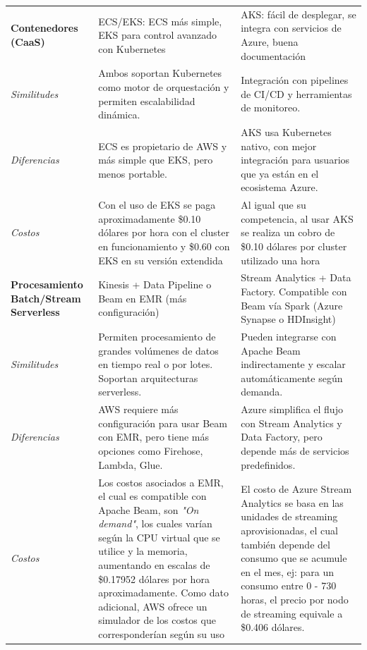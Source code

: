 \documentclass[12pt]{article}
\begin{document}
\begin{longtable}{|>{\RaggedRight\arraybackslash}p{4cm}|>{\RaggedRight\arraybackslash}p{5cm}|>{\RaggedRight\arraybackslash}p{5cm}|}
		\textbf{Contenedores (CaaS)} & ECS/EKS: ECS más simple, EKS para control avanzado con Kubernetes & AKS: fácil de desplegar, se integra con servicios de Azure, buena documentación \\
		\textit{Similitudes} & Ambos soportan Kubernetes como motor de orquestación y permiten escalabilidad dinámica. & Integración con pipelines de CI/CD y herramientas de monitoreo. \\
		\textit{Diferencias} & ECS es propietario de AWS y más simple que EKS, pero menos portable. & AKS usa Kubernetes nativo, con mejor integración para usuarios que ya están en el ecosistema Azure. \\
		\textit{Costos} & Con el uso de EKS se paga aproximadamente \$0.10 dólares por hora con el cluster en funcionamiento y \$0.60 con EKS en su versión extendida & Al igual que su competencia, al usar AKS se realiza un cobro de \$0.10 dólares por cluster utilizado una hora \\
		\hline
		
		\textbf{Procesamiento Batch/Stream Serverless} & Kinesis + Data Pipeline o Beam en EMR (más configuración) & Stream Analytics + Data Factory. Compatible con Beam vía Spark (Azure Synapse o HDInsight) \\
		\textit{Similitudes} & Permiten procesamiento de grandes volúmenes de datos en tiempo real o por lotes. Soportan arquitecturas serverless. & Pueden integrarse con Apache Beam indirectamente y escalar automáticamente según demanda. \\
		\textit{Diferencias} & AWS requiere más configuración para usar Beam con EMR, pero tiene más opciones como Firehose, Lambda, Glue. & Azure simplifica el flujo con Stream Analytics y Data Factory, pero depende más de servicios predefinidos. \\
		\textit{Costos} & Los costos asociados a EMR, el cual es compatible con Apache Beam, son \textit{"On demand"}, los cuales varían según la CPU virtual que se utilice y la memoria, aumentando en escalas de \$0.17952 dólares por hora aproximadamente. Como dato adicional, AWS ofrece un simulador de los costos que corresponderían según su uso & El costo de Azure Stream Analytics se basa en las unidades de streaming aprovisionadas, el cual también depende del consumo que se acumule en el mes, ej: para un consumo entre 0 - 730 horas, el precio por nodo de streaming equivale a \$0.406 dólares. \\
		\hline
		

\end{longtable}
\end{document}
